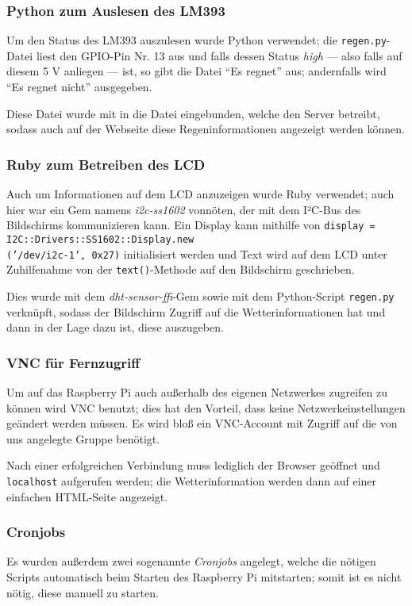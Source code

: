 \documentclass[a4paper,12pt]{article}
\begin{document}
\subsubsection{Python zum Auslesen des LM393}
Um den Status des LM393 auszulesen wurde Python verwendet; die \texttt{regen.py}-Datei liest den GPIO-Pin Nr. 13 aus und falls dessen Status \textit{high} — also falls auf diesem 5 V anliegen — ist, so gibt die Datei "`Es regnet"' aus; andernfalls wird "`Es regnet nicht"' ausgegeben.

Diese Datei wurde mit in die Datei eingebunden, welche den Server betreibt, sodass auch auf der Webseite diese Regeninformationen angezeigt werden können.

\subsubsection{Ruby zum Betreiben des LCD}
Auch um Informationen auf dem LCD anzuzeigen wurde Ruby verwendet; auch hier war ein Gem namens \textit{i2c-ss1602} vonnöten, der mit dem I²C-Bus des Bildschirms kommunizieren kann.
Ein Display kann mithilfe von \texttt{display = I2C::Drivers::SS1602::Display.new\\('/dev/i2c-1', 0x27)} initialisiert werden und Text wird auf dem LCD unter Zuhilfenahme von der \texttt{text()}-Methode auf den Bildschirm geschrieben.

Dies wurde mit dem \textit{dht-sensor-ffi}-Gem sowie mit dem Python-Script \texttt{regen.py} verknüpft, sodass der Bildschirm Zugriff auf die Wetterinformationen hat und dann in der Lage dazu ist, diese auszugeben.

\subsubsection{VNC für Fernzugriff}
Um auf das Raspberry Pi auch außerhalb des eigenen Netzwerkes zugreifen zu können wird VNC benutzt; dies hat den Vorteil, dass keine Netzwerkeinstellungen geändert werden müssen. Es wird bloß ein VNC-Account mit Zugriff auf die von uns angelegte Gruppe benötigt.

Nach einer erfolgreichen Verbindung muss lediglich der Browser geöffnet und \texttt{localhost} aufgerufen werden; die Wetterinformation werden dann auf einer einfachen HTML-Seite angezeigt.

\subsubsection{Cronjobs}
Es wurden außerdem zwei sogenannte \textit{Cronjobs} angelegt, welche die nötigen Scripts automatisch beim Starten des Raspberry Pi mitstarten; somit ist es nicht nötig, diese manuell zu starten. 
\end{document}
